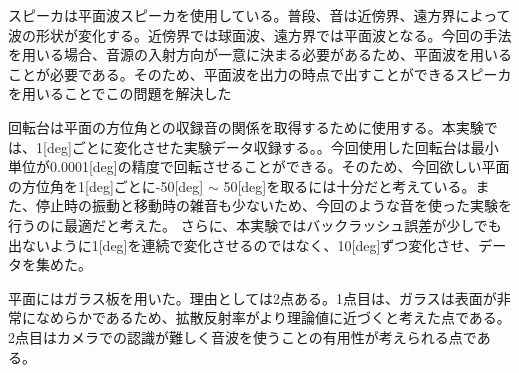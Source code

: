 スピーカは平面波スピーカを使用している。普段、音は近傍界、遠方界によって波の形状が変化する。近傍界では球面波、遠方界では平面波となる。今回の手法を用いる場合、音源の入射方向が一意に決まる必要があるため、平面波を用いることが必要である。そのため、平面波を出力の時点で出すことができるスピーカを用いることでこの問題を解決した

回転台は平面の方位角との収録音の関係を取得するために使用する。本実験では、1[deg]ごとに変化させた実験データ収録する。。今回使用した回転台は最小単位が0.0001[deg]の精度で回転させることができる。そのため、今回欲しい平面の方位角を1[deg]ごとに-50[deg] $\sim$ 50[deg]を取るには十分だと考えている。また、停止時の振動と移動時の雑音も少ないため、今回のような音を使った実験を行うのに最適だと考えた。
さらに、本実験ではバックラッシュ誤差が少しでも出ないように1[deg]を連続で変化させるのではなく、10[deg]ずつ変化させ、データを集めた。

平面にはガラス板を用いた。理由としては2点ある。1点目は、ガラスは表面が非常になめらかであるため、拡散反射率がより理論値に近づくと考えた点である。2点目はカメラでの認識が難しく音波を使うことの有用性が考えられる点である。

